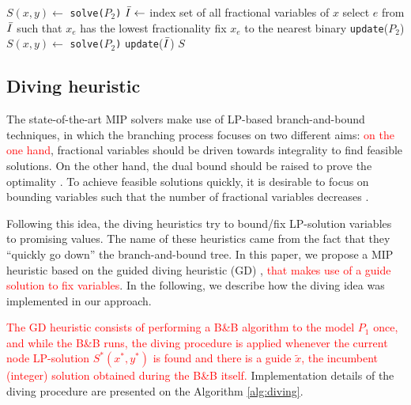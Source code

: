 \documentclass{ro}
\begin{document}
\begin{algorithm}[!h]
	\caption{\hspace{-1mm}\textbf{: RF }($P_2$)}
	\label{alg:rf}
	{\footnotesize
		\begin{algorithmic}[1]	
			\STATE $S(x,y)\gets$ \texttt{solve($P_2$)} 
			\STATE $\Bar{I} \gets$ index set of all fractional variables of $x$
			\STATE select $e$ from $\Bar{I}$ such that $x_e$ has the lowest fractionality 
			\STATE fix $x_e$ to the nearest binary
			\STATE \texttt{update}($P_2$)
			\STATE $S(x,y)\gets$ \texttt{solve($P_2$)} 
			\STATE \texttt{update}($\Bar{I}$)
			\ENDWHILE
			\RETURN $S$
		\end{algorithmic}
	}
\end{algorithm}

\subsection{Diving heuristic}

The state-of-the-art MIP solvers make use of  LP-based branch-and-bound techniques, in which the branching process focuses on two different aims:  \textcolor{red}{on the one hand}, fractional variables should be driven towards integrality  to find feasible solutions. On the other hand, the dual bound should be raised  to prove the optimality \cite{achterberg2009hybrid}. To achieve feasible solutions quickly, it is desirable to focus on bounding variables such that the number of fractional variables decreases \cite{berthold2006primal}.

Following this idea, the diving heuristics try  to bound/fix LP-solution variables to promising values. The name of these heuristics came from the fact that they ``quickly go down'' the branch-and-bound tree. In this paper, we propose a MIP heuristic based on the guided diving  heuristic (GD) \cite{berthold2008heuristics}, \textcolor{red}{that makes use of a guide solution to fix variables}. In the following, we describe how the diving idea was implemented in our approach.


\textcolor{red}{The GD heuristic consists of performing a B\&B algorithm to the model $P_1$ once, and while the B\&B runs, the diving procedure is applied whenever the current node LP-solution $S^*(x^*,y^*)$ is found and there is a guide $\tilde{x}$, the incumbent (integer) solution obtained during the B\&B itself.} Implementation details of the diving procedure are presented on the Algorithm \ref{alg:diving}.
\end{document}
